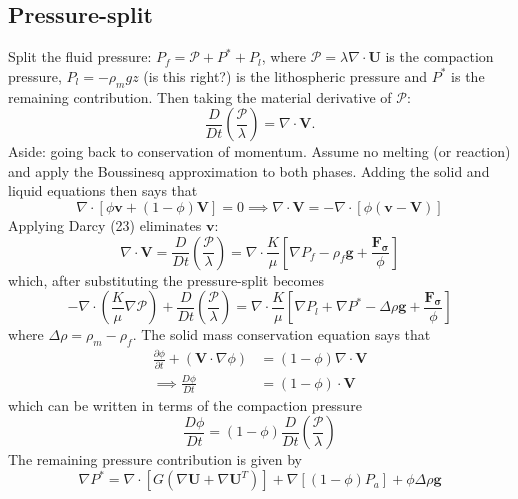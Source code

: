 \documentclass[9pt,fleqn,twoside]{article}
\theoremstyle{plain}
\theoremstyle{definition}
\theoremstyle{remark}
\begin{document}
\subsection{Pressure-split}
Split the fluid pressure: $P_f = \mathcal{P} + P^{*} + P_l$, where $\mathcal{P} = \lambda \nabla \cdot \mathbf{U}$ is the compaction pressure, $P_l= -\rho_m g z$ (is this right?) is the lithospheric pressure and $P^{*}$ is the remaining contribution. Then taking the material derivative of $\mathcal{P}$:
\begin{equation}
\boxed{\frac{D}{Dt} \left (\frac{\mathcal{P}}{\lambda} \right) = \nabla \cdot \mathbf{V}} .
\end{equation}
Aside: going back to conservation of momentum. Assume no melting (or reaction) and apply the Boussinesq approximation to both phases. Adding the solid and liquid equations then says that
\begin{equation}
\nabla \cdot [ \phi \mathbf{v} + (1 - \phi) \mathbf{V} ] = 0 \implies \nabla \cdot \mathbf{V} = - \nabla \cdot [\phi(\mathbf{v} - \mathbf{V})] 
\end{equation}
Applying Darcy (23) eliminates $\mathbf{v}$:
\begin{equation}
\nabla \cdot \mathbf{V} = \frac{D}{Dt} \left (\frac{\mathcal{P}}{\lambda}\right) = \nabla \cdot \frac{K}{\mu} \left [ \nabla P_f - \rho_f \mathbf{g} + \frac{\mathbf{F_{\sigma}}}{\phi} \right ]
\end{equation}
which, after substituting the pressure-split becomes
\begin{equation}
\boxed{- \nabla \cdot \left( \frac{K}{\mu} \nabla \mathcal{P} \right ) + \frac{D}{Dt} \left (\frac{\mathcal{P}}{\lambda}\right) = \nabla \cdot\frac{K}{\mu} \left [ \nabla P_l + \nabla P^{*} - \Delta \rho \mathbf{g} + \frac{\mathbf{F_{\sigma}}}{\phi} \right ]}
\end{equation}
where $\Delta \rho = \rho_m - \rho_f$.
The solid mass conservation equation says that
\begin{align}
\frac{\partial \phi}{\partial t} + (\mathbf{V} \cdot \nabla \phi) &= (1-\phi) \nabla \cdot \mathbf{V} \\
\implies \frac{D \phi}{Dt} &= ( 1 - \phi) \cdot \mathbf{V}
\end{align}
which can be written in terms of the compaction pressure
\begin{equation}
\boxed{\frac{D \phi}{D t} = (1 - \phi) \frac{D}{Dt} \left (\frac{\mathcal{P}}{\lambda}\right)}
\end{equation}
The remaining pressure contribution is given by
\begin{equation}
\boxed{\nabla P^{*} = \nabla \cdot [ G (\nabla \mathbf{U} + \nabla\mathbf{U}^{T} )] + \nabla[(1 - \phi) P_a] + \phi \Delta \rho \mathbf{g}}
\end{equation}
\end{document}
